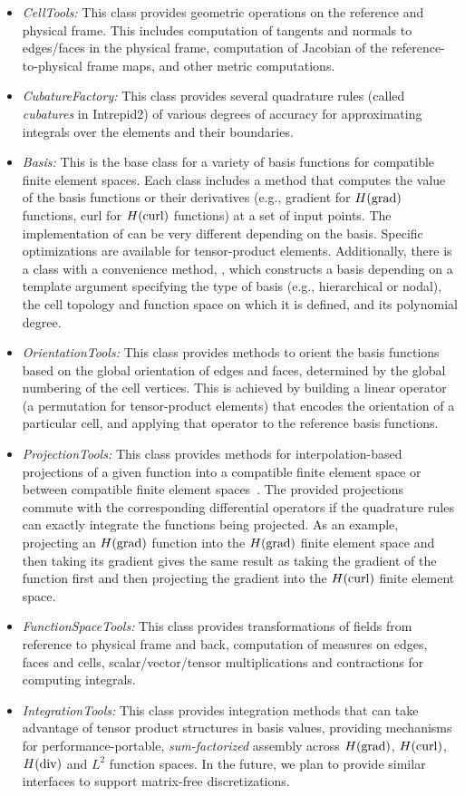 \begin{itemize}
\item \emph{CellTools:} This class provides geometric operations on the reference and physical frame. This includes computation of tangents and normals to edges/faces in the physical frame, computation of Jacobian of the reference-to-physical frame maps, and other metric computations. 
\item \emph{CubatureFactory:} This class provides several quadrature rules (called \emph{cubatures} in Intrepid2) of various degrees of accuracy for approximating integrals over the elements and their boundaries.
\item \emph{Basis:} This is the base class for a variety of basis functions for compatible finite element spaces. Each class includes a  method that computes the value of the basis functions or their derivatives (e.g., gradient for $H({\rm grad})$ functions, curl for $H({\rm curl})$ functions) at a set of input points. The implementation of  can be very different depending on the basis. Specific optimizations are available for tensor-product elements.  Additionally, there is a  class with a convenience method, , which constructs a basis depending on a template argument specifying the type of basis (e.g., hierarchical or nodal), the cell topology and function space on which it is defined, and its polynomial degree.
\item \emph{OrientationTools:} This class provides methods to orient the basis functions based on the global orientation of edges and faces, determined by the global numbering of the cell vertices. This is achieved by building a linear operator (a permutation for tensor-product elements) that encodes the orientation of a particular cell, and applying that operator to the reference basis functions.
\item \emph{ProjectionTools:} This class provides methods for interpolation-based projections of a given function into a compatible finite element space or between compatible finite element spaces~\cite{demkowicz2007}.  The provided projections commute with the corresponding differential operators if the quadrature rules can exactly integrate the functions being projected. As an example, projecting an $H({\rm grad})$ function into the $H({\rm grad})$ finite element space and then taking its gradient gives the same result as taking the gradient of the function first and then projecting the gradient into the $H({\rm curl})$ finite element space.
\item \emph{FunctionSpaceTools:} This class provides transformations of fields from reference to physical frame and back, computation of measures on edges, faces and cells, scalar/vector/tensor multiplications and contractions for computing integrals.
\item \emph{IntegrationTools:} This class provides integration methods that can take advantage of tensor product structures in basis values, providing mechanisms for performance-portable, \emph{sum-factorized} assembly across $H({\rm grad})$, $H({\rm curl})$, $H({\rm div})$ and $L^2$ function spaces.  In the future, we plan to provide similar interfaces to support matrix-free discretizations.
\end{itemize}
